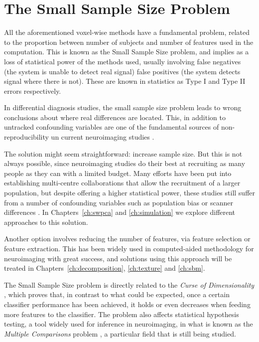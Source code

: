 \section{The Small Sample Size Problem}\label{sec:smallsamplesize}
All the aforementioned voxel-wise methods have a fundamental problem, related to the proportion between number of subjects and number of features used in the computation. This is known as the Small Sample Size problem, and implies as a loss of statistical power of the methods used, usually involving false negatives (the system is unable to detect real signal) false positives (the system detects signal where there is not). These are known in statistics as Type I and Type II errors respectively. 

In differential diagnosis studies, the small sample size problem leads to wrong conclusions about where real differences are located. This, in addition to untracked confounding variables are one of the fundamental sources of non-re\-pro\-du\-ci\-bi\-li\-ty un current neuroimaging studies \cite{Button2013}. 

The solution might seem straightforward: increase sample size. But this is not always possible, since neuroimaging studies do their best at recruiting as many people as they can with a limited budget. Many efforts have been put into establishing multi-centre collaborations that allow the recruitment of a larger population, but despite offering a higher statistical power, these studies still suffer from a number of confounding variables such as population bias or scanner differences \cite{haar2014anatomical}. In Chapters~\ref{ch:swpca} and \ref{ch:simulation} we explore different approaches to this solution. 

Another option involves reducing the number of features, via feature selection or feature extraction. This has been widely used in computed-aided methodology for neuroimaging \cite{DeMartino2007,xu2009source,Gorriz2010,Illan2011,Martinez-Murcia2016} with great success, and solutions using this approach will be treated in Chapters~\ref{ch:decomposition}, \ref{ch:texture} and \ref{ch:sbm}. 

The Small Sample Size problem is directly related to the \textit{Curse of Dimensionality} \cite{Krishnaiah1982}, which proves that, in contrast to what could be expected, once a certain classifier performance has been achieved, it holds or even decreases when feeding more features to the classifier. The problem also affects statistical hypothesis testing, a tool widely used for inference in neuroimaging, in what is known as the \textit{Multiple Comparisons} problem \cite{Benjamini2010}, a particular field that is still being studied. 


